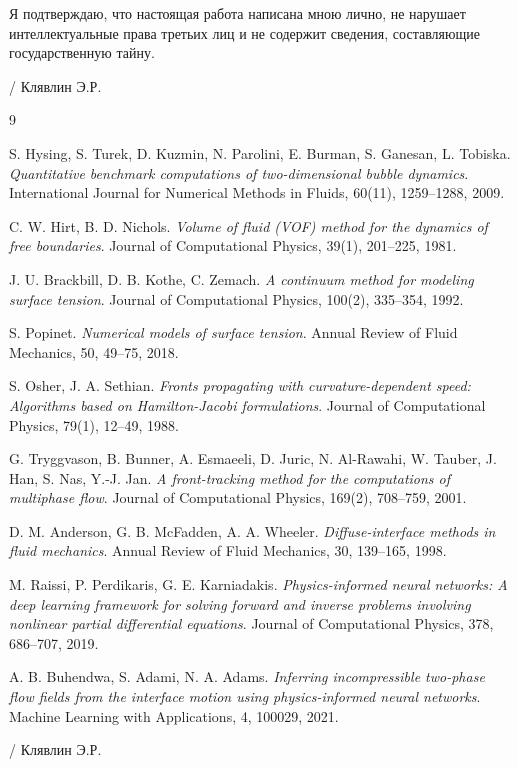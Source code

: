 \documentclass[12pt,a4paper]{article}
\begin{document}
\vspace{2em}
Я подтверждаю, что настоящая работа написана мною лично, не нарушает интеллектуальные права третьих лиц и не содержит сведения, составляющие государственную тайну.

\vspace{2em}
\noindent\hfill\underline{\hspace{3cm}} / Клявлин Э.Р.

\begin{thebibliography}{9}

S. Hysing, S. Turek, D. Kuzmin, N. Parolini, E. Burman, S. Ganesan, L. Tobiska.
\textit{Quantitative benchmark computations of two-dimensional bubble dynamics}.
International Journal for Numerical Methods in Fluids, 60(11), 1259--1288, 2009.

C. W. Hirt, B. D. Nichols.
\textit{Volume of fluid (VOF) method for the dynamics of free boundaries}.
Journal of Computational Physics, 39(1), 201--225, 1981.

J. U. Brackbill, D. B. Kothe, C. Zemach.
\textit{A continuum method for modeling surface tension}.
Journal of Computational Physics, 100(2), 335--354, 1992.

S. Popinet.
\textit{Numerical models of surface tension}.
Annual Review of Fluid Mechanics, 50, 49--75, 2018.

S. Osher, J. A. Sethian.
\textit{Fronts propagating with curvature-dependent speed: Algorithms based on Hamilton-Jacobi formulations}.
Journal of Computational Physics, 79(1), 12--49, 1988.

G. Tryggvason, B. Bunner, A. Esmaeeli, D. Juric, N. Al-Rawahi, W. Tauber,
J. Han, S. Nas, Y.-J. Jan.
\textit{A front-tracking method for the computations of multiphase flow}.
Journal of Computational Physics, 169(2), 708--759, 2001.

D. M. Anderson, G. B. McFadden, A. A. Wheeler.
\textit{Diffuse-interface methods in fluid mechanics}.
Annual Review of Fluid Mechanics, 30, 139--165, 1998.

M. Raissi, P. Perdikaris, G. E. Karniadakis.
\textit{Physics-informed neural networks: A deep learning framework for solving forward and inverse problems involving nonlinear partial differential equations}.
Journal of Computational Physics, 378, 686--707, 2019.

A. B. Buhendwa, S. Adami, N. A. Adams.
\textit{Inferring incompressible two-phase flow fields from the interface motion using physics-informed neural networks}.
Machine Learning with Applications, 4, 100029, 2021.

\vspace{2em}
\noindent\hfill\underline{\hspace{3cm}} / Клявлин Э.Р.

\end{thebibliography}
\end{document}
